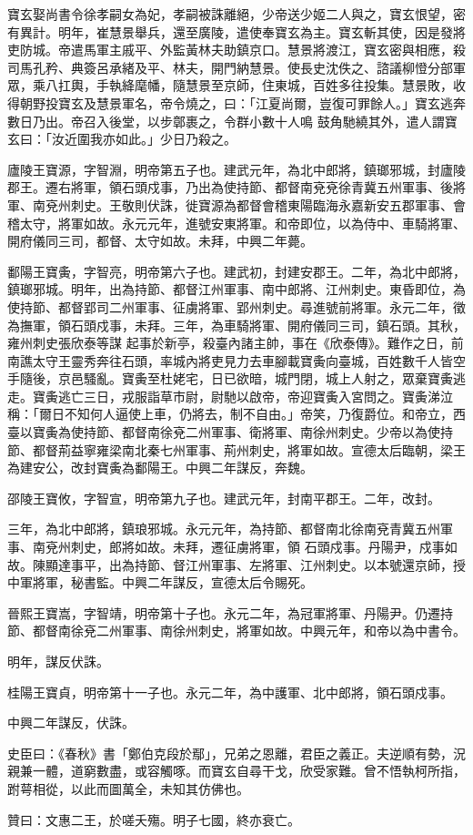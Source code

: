 \begin{pinyinscope}
 寶玄娶尚書令徐孝嗣女為妃，孝嗣被誅離絕，少帝送少姬二人與之，寶玄恨望，密有異計。明年，崔慧景舉兵，還至廣陵，遣使奉寶玄為主。寶玄斬其使，因是發將吏防城。帝遣馬軍主戚平、外監黃林夫助鎮京口。慧景將渡江，寶玄密與相應，殺司馬孔矜、典簽呂承緒及平、林夫，開門納慧景。使長史沈佚之、諮議柳憕分部軍眾，乘八扛輿，手執絳麾幡，隨慧景至京師，住東城，百姓多往投集。慧景敗，收得朝野投寶玄及慧景軍名，帝令燒之，曰：「江夏尚爾，豈復可罪餘人。」寶玄逃奔數日乃出。帝召入後堂，以步鄣裹之，令群小數十人鳴
 鼓角馳繞其外，遣人謂寶玄曰：「汝近圍我亦如此。」少日乃殺之。



 廬陵王寶源，字智淵，明帝第五子也。建武元年，為北中郎將，鎮瑯邪城，封廬陵郡王。遷右將軍，領石頭戍事，乃出為使持節、都督南兗兗徐青冀五州軍事、後將軍、南兗州刺史。王敬則伏誅，徙寶源為都督會稽東陽臨海永嘉新安五郡軍事、會稽太守，將軍如故。永元元年，進號安東將軍。和帝即位，以為侍中、車騎將軍、開府儀同三司，都督、太守如故。未拜，中興二年薨。



 鄱陽王寶夤，字智亮，明帝第六子也。建武初，封建安郡王。二年，為北中郎將，鎮瑯邪城。明年，出為持節、都督江州軍事、南中郎將、江州刺史。東昏即位，為使持節、都督郢司二州軍事、征虜將軍、郢州刺史。尋進號前將軍。永元二年，徵為撫軍，領石頭戍事，未拜。三年，為車騎將軍、開府儀同三司，鎮石頭。其秋，雍州刺史張欣泰等謀
 起事於新亭，殺臺內諸主帥，事在《欣泰傳》。難作之日，前南譙太守王靈秀奔往石頭，率城內將吏見力去車腳載寶夤向臺城，百姓數千人皆空手隨後，京邑騷亂。寶夤至杜姥宅，日已欲暗，城門閉，城上人射之，眾棄寶夤逃走。寶夤逃亡三日，戎服詣草市尉，尉馳以啟帝，帝迎寶夤入宮問之。寶夤涕泣稱：「爾日不知何人逼使上車，仍將去，制不自由。」帝笑，乃復爵位。和帝立，西臺以寶夤為使持節、都督南徐兗二州軍事、衛將軍、南徐州刺史。少帝以為使持節、都督荊益寧雍梁南北秦七州軍事、荊州刺史，將軍如故。宣德太后臨朝，梁王為建安公，改封寶夤為鄱陽王。中興二年謀反，奔魏。



 邵陵王寶攸，字智宣，明帝第九子也。建武元年，封南平郡王。二年，改封。



 三年，為北中郎將，鎮琅邪城。永元元年，為持節、都督南北徐南兗青冀五州軍事、南兗州刺史，郎將如故。未拜，遷征虜將軍，領
 石頭戍事。丹陽尹，戍事如故。陳顯達事平，出為持節、督江州軍事、左將軍、江州刺史。以本號還京師，授中軍將軍，秘書監。中興二年謀反，宣德太后令賜死。



 晉熙王寶嵩，字智靖，明帝第十子也。永元二年，為冠軍將軍、丹陽尹。仍遷持節、都督南徐兗二州軍事、南徐州刺史，將軍如故。中興元年，和帝以為中書令。



 明年，謀反伏誅。



 桂陽王寶貞，明帝第十一子也。永元二年，為中護軍、北中郎將，領石頭戍事。



 中興二年謀反，伏誅。



 史臣曰：《春秋》書「鄭伯克段於鄢」，兄弟之恩離，君臣之義正。夫逆順有勢，況親兼一體，道窮數盡，或容觸啄。而寶玄自尋干戈，欣受家難。曾不悟執柯所指，跗萼相從，以此而圖萬全，未知其仿佛也。



 贊曰：文惠二王，於嗟夭殤。明子七國，終亦衰亡。



\end{pinyinscope}